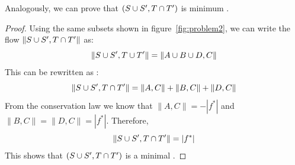 Analogously, we can prove that $(S \cup S', T \cap T')$ is minimum \stcut{}.
\begin{proof}
Using the same subsets shown in figure~\ref{fig:problem2}, we can write the flow $\| S \cup S', T \cap T' \|$ as:
\begin{equation}
\| S \cup S', T \cup T' \| = \| A \cup B \cup D, C \|
\end{equation}
This can be rewritten as :
\begin{equation}
\| S \cup S', T \cap T' \| = \| A, C \| + \| B, C \| + \| D, C \|
\end{equation}
From the conservation law we know that $\| A, C \| = -|f^{*}|$ and $\|B, C\| = \|D, C\| = |f^{*}|$.
Therefore,
\begin{equation}
\| S \cup S', T \cap T' \| = |f^{*}|
\end{equation}
This shows that $(S \cup S', T \cap T')$ is a minimal \stcut{}.
\end{proof}

